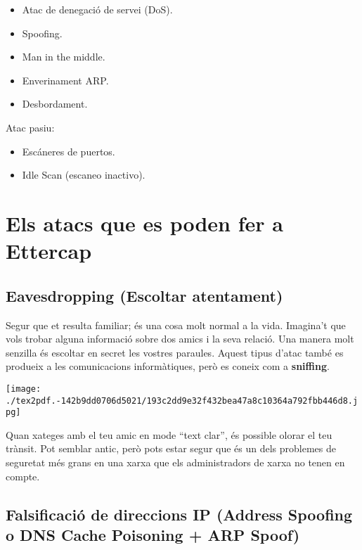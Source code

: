\documentclass[]{article}
\begin{document}
\begin{itemize}
\item
  Atac de denegació de servei (DoS).
\item
  Spoofing.
\item
  Man in the middle.
\item
  Enverinament ARP.
\item
  Desbordament.
\end{itemize}

Atac pasiu:

\begin{itemize}
\item
  Escáneres de puertos.
\item
  Idle Scan (escaneo inactivo).
\end{itemize}

\hypertarget{els-atacs-que-es-poden-fer-a-ettercap}{%
\section{\texorpdfstring{\textbf{Els atacs que es poden fer a
Ettercap}}{Els atacs que es poden fer a Ettercap}}\label{els-atacs-que-es-poden-fer-a-ettercap}}

\hypertarget{eavesdropping-escoltar-atentament}{%
\subsection{\texorpdfstring{\textbf{Eavesdropping (Escoltar
atentament)}}{Eavesdropping (Escoltar atentament)}}\label{eavesdropping-escoltar-atentament}}

Segur que et resulta familiar; és una cosa molt normal a la vida.
Imagina't que vols trobar alguna informació sobre dos amics i la seva
relació. Una manera molt senzilla és escoltar en secret les vostres
paraules. Aquest tipus d'atac també es produeix a les comunicacions
informàtiques, però es coneix com a \textbf{sniffing}.

\texttt{[image: ./tex2pdf.-142b9dd0706d5021/193c2dd9e32f432bea47a8c10364a792fbb446d8.jpg]}

Quan xateges amb el teu amic en mode ``text clar'', és possible olorar
el teu trànsit. Pot semblar antic, però pots estar segur que és un dels
problemes de seguretat més grans en una xarxa que els administradors de
xarxa no tenen en compte.

\hypertarget{falsificaciuxf3-de-direccions-ip-address-spoofing-o-dns-cache-poisoning-arp-spoof}{%
\subsection{\texorpdfstring{\textbf{Falsificació de direccions IP
(Address Spoofing o DNS Cache Poisoning + ARP
Spoof)}}{Falsificació de direccions IP (Address Spoofing o DNS Cache Poisoning + ARP Spoof)}}\label{falsificaciuxf3-de-direccions-ip-address-spoofing-o-dns-cache-poisoning-arp-spoof}}
\end{document}
